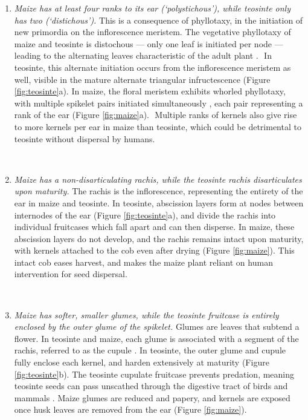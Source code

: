 \documentclass[a4paper]{article}
\newcommand{\mcs}[1]{\todo[size=\tiny, color=magenta!20]{#1}}
\begin{document}
\begin{enumerate}
﻿ \item \textit{Maize has at least four ranks to its ear (`polystichous'), while teosinte only has two (`distichous').}
 This is a consequence of phyllotaxy, in the initiation of new primordia on the inflorescence meristem.
 The vegetative phyllotaxy of maize and teosinte is distochous --- only one leaf is initiated per node --- leading to the alternating leaves characteristic of the adult plant \citep{jackson1999}.
 ﻿ In teosinte, this alternate initiation occurs from the inflorescence meristem as well, visible in the mature alternate triangular infructescence \citep{sundberg1990} (Figure \ref{fig:teosinte}a).
 In maize, the floral meristem exhibits whorled phyllotaxy, with multiple spikelet pairs initiated simultaneously \citep{bartlett2014}, each ﻿pair representing a rank of the ear (Figure \ref{fig:maize}a).
 ﻿ Multiple ranks of kernels also give rise to more kernels per ear in maize than teosinte, which could be detrimental to teosinte without dispersal by humans. \mcs{ending unclear}

﻿ \item \textit{Maize has a non-disarticulating rachis, while the teosinte rachis disarticulates upon maturity.}
 The rachis is the inflorescence, representing the entirety of the ear in maize and teosinte.
 In teosinte, abscission layers form at nodes between internodes of the ear (Figure \ref{fig:teosinte}a), and divide the rachis into individual fruitcases which fall apart and can then disperse.
 In maize, these abscission layers do not develop, and the rachis remains intact upon maturity, with kernels attached to the cob even after drying \citep{iltis2000, chavez2012} (Figure \ref{fig:maize}).
 This intact cob eases harvest, and makes the maize plant reliant on human intervention for seed dispersal.

﻿ \item \textit{Maize has softer, smaller glumes, while the teosinte fruitcase is entirely enclosed by the outer glume of the spikelet.}
 Glumes are leaves that subtend a flower.
 In teosinte and maize, each glume is associated with a segment of the rachis, referred to as the cupule \citep{dorweiler1997}.
In teosinte, the outer glume and cupule fully enclose each kernel, and harden extensively at maturity (Figure \ref{fig:teosinte}b).
 The teosinte cupulate fruitcase prevents predation, meaning teosinte seeds can pass unscathed through the digestive tract of birds and mammals \citep{wilkes1967}.
 Maize glumes are reduced and papery, and kernels are exposed once husk leaves are removed from the ear (Figure \ref{fig:maize}).


\end{enumerate}
\end{document}
